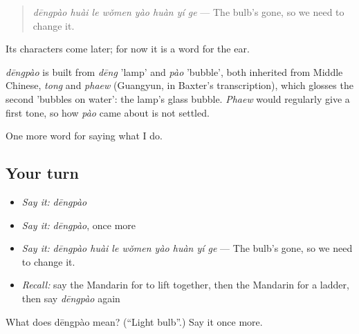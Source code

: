 \begin{quote}
\emph{dēngpào huài le wǒmen yào huàn yí ge} — The bulb's gone, so we need to change it.
\end{quote}

Its characters come later; for now it is a word for the ear.

\begin{cousinweb}
\emph{dēngpào} is built from \emph{dēng} 'lamp' and \emph{pào} 'bubble', both inherited from Middle Chinese, \emph{tong} and \emph{phaew} (Guangyun, in Baxter's transcription), which glosses the second 'bubbles on water': the lamp's glass bubble. \emph{Phaew} would regularly give a first tone, so how \emph{pào} came about is not settled.
\end{cousinweb}

\begin{grammarlens}[title={What you've built}]
One more word for saying what I do.
\end{grammarlens}

\subsection*{Your turn}
\begin{itemize}
\raggedright
  \item \emph{Say it:} \emph{dēngpào}
  \item \emph{Say it:} \emph{dēngpào}, once more
  \item \emph{Say it:} \emph{dēngpào huài le wǒmen yào huàn yí ge} — The bulb's gone, so we need to change it.
  \item \emph{Recall:} say the Mandarin for to lift together, then the Mandarin for a ladder, then say \emph{dēngpào} again
\end{itemize}

\begin{tcolorbox}[breakable,colback=teal!4,colframe=teal!35!black,title={Before you move on}]
What does dēngpào mean? (\textquotedblleft{}Light bulb\textquotedblright{}.) Say it once more.
\end{tcolorbox}
